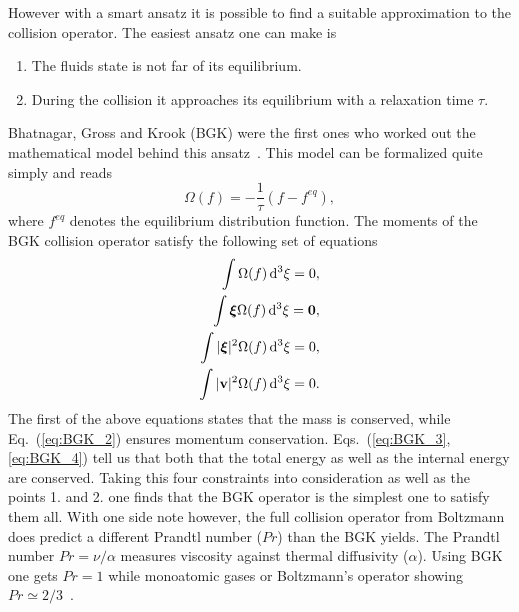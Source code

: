 However with a smart ansatz it is possible to find a suitable approximation to the collision operator.
The easiest ansatz one can make is
\begin{enumerate}
    \item The fluids state is not far of its equilibrium.
    \item During the collision it approaches its equilibrium with a relaxation time $\tau$.
\end{enumerate}
Bhatnagar, Gross and Krook (BGK) were the first ones who worked out the mathematical model behind this ansatz~\cite{PhysRev.94.511}.
This model can be formalized quite simply and reads
\begin{equation}
    \Omega(f) = -\frac{1}{\tau}(f - f^{eq}),
\end{equation}
where $f^{eq}$ denotes the equilibrium distribution function.
The moments of the BGK collision operator satisfy the following set of equations
\begin{align}
    \int \Omega(f) \mathop{}\!\mathrm{d}^3\xi = 0, \label{eq:BGK_1}\\
    \int {\boldsymbol\xi}\Omega(f) \mathop{}\!\mathrm{d}^3\xi = \mathbf{0}, \label{eq:BGK_2}\\
    \int |{\boldsymbol\xi}|^2\Omega(f) \mathop{}\!\mathrm{d}^3\xi = 0, \label{eq:BGK_3}\\
    \int |\mathbf{v}|^2\Omega(f) \mathop{}\!\mathrm{d}^3\xi = 0. \label{eq:BGK_4}
\end{align}
The first of the above equations states that the mass is conserved, while Eq.~(\ref{eq:BGK_2}) ensures momentum conservation.
Eqs.~(\ref{eq:BGK_3}, \ref{eq:BGK_4}) tell us that both that the total energy as well as the internal energy are conserved.
Taking this four constraints into consideration as well as the points 1. and 2. one finds that the BGK operator is the simplest one to satisfy them all.
With one side note however, the full collision operator from Boltzmann does predict a different Prandtl number ($Pr$) than the BGK yields.
The Prandtl number $Pr = \nu/\alpha$ measures viscosity against thermal diffusivity ($\alpha$). 
Using BGK one gets $Pr=1$ while monoatomic gases or Boltzmann's operator showing $Pr\simeq 2/3$~\cite{cercignani1988boltzmann, krueger2017}.

